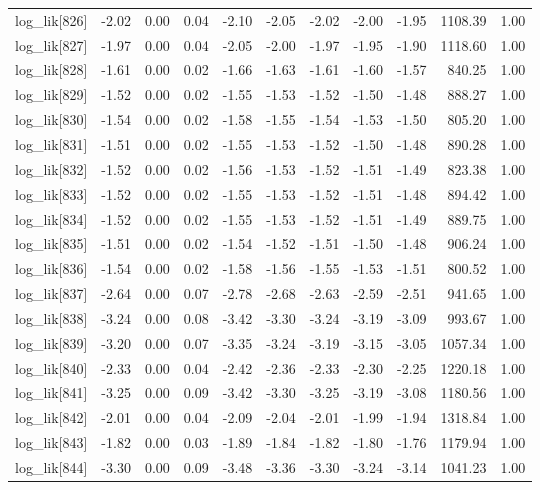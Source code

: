 \begin{table}[ht]
\begin{tabular}{rrrrrrrrrrr}
  log\_lik[826] & -2.02 & 0.00 & 0.04 & -2.10 & -2.05 & -2.02 & -2.00 & -1.95 & 1108.39 & 1.00 \\ 
  log\_lik[827] & -1.97 & 0.00 & 0.04 & -2.05 & -2.00 & -1.97 & -1.95 & -1.90 & 1118.60 & 1.00 \\ 
  log\_lik[828] & -1.61 & 0.00 & 0.02 & -1.66 & -1.63 & -1.61 & -1.60 & -1.57 & 840.25 & 1.00 \\ 
  log\_lik[829] & -1.52 & 0.00 & 0.02 & -1.55 & -1.53 & -1.52 & -1.50 & -1.48 & 888.27 & 1.00 \\ 
  log\_lik[830] & -1.54 & 0.00 & 0.02 & -1.58 & -1.55 & -1.54 & -1.53 & -1.50 & 805.20 & 1.00 \\ 
  log\_lik[831] & -1.51 & 0.00 & 0.02 & -1.55 & -1.53 & -1.52 & -1.50 & -1.48 & 890.28 & 1.00 \\ 
  log\_lik[832] & -1.52 & 0.00 & 0.02 & -1.56 & -1.53 & -1.52 & -1.51 & -1.49 & 823.38 & 1.00 \\ 
  log\_lik[833] & -1.52 & 0.00 & 0.02 & -1.55 & -1.53 & -1.52 & -1.51 & -1.48 & 894.42 & 1.00 \\ 
  log\_lik[834] & -1.52 & 0.00 & 0.02 & -1.55 & -1.53 & -1.52 & -1.51 & -1.49 & 889.75 & 1.00 \\ 
  log\_lik[835] & -1.51 & 0.00 & 0.02 & -1.54 & -1.52 & -1.51 & -1.50 & -1.48 & 906.24 & 1.00 \\ 
  log\_lik[836] & -1.54 & 0.00 & 0.02 & -1.58 & -1.56 & -1.55 & -1.53 & -1.51 & 800.52 & 1.00 \\ 
  log\_lik[837] & -2.64 & 0.00 & 0.07 & -2.78 & -2.68 & -2.63 & -2.59 & -2.51 & 941.65 & 1.00 \\ 
  log\_lik[838] & -3.24 & 0.00 & 0.08 & -3.42 & -3.30 & -3.24 & -3.19 & -3.09 & 993.67 & 1.00 \\ 
  log\_lik[839] & -3.20 & 0.00 & 0.07 & -3.35 & -3.24 & -3.19 & -3.15 & -3.05 & 1057.34 & 1.00 \\ 
  log\_lik[840] & -2.33 & 0.00 & 0.04 & -2.42 & -2.36 & -2.33 & -2.30 & -2.25 & 1220.18 & 1.00 \\ 
  log\_lik[841] & -3.25 & 0.00 & 0.09 & -3.42 & -3.30 & -3.25 & -3.19 & -3.08 & 1180.56 & 1.00 \\ 
  log\_lik[842] & -2.01 & 0.00 & 0.04 & -2.09 & -2.04 & -2.01 & -1.99 & -1.94 & 1318.84 & 1.00 \\ 
  log\_lik[843] & -1.82 & 0.00 & 0.03 & -1.89 & -1.84 & -1.82 & -1.80 & -1.76 & 1179.94 & 1.00 \\ 
  log\_lik[844] & -3.30 & 0.00 & 0.09 & -3.48 & -3.36 & -3.30 & -3.24 & -3.14 & 1041.23 & 1.00 \\ 

\end{tabular}
\end{table}
